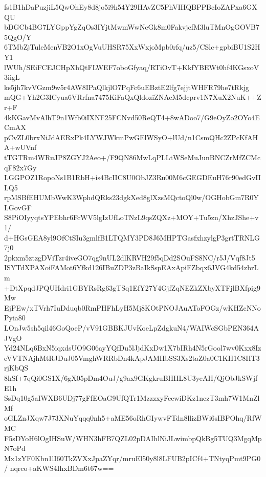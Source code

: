 fs1B1hDaPuzjiL5QwOhEy8d8jo5i9h54Y29HAvZC5PhVIHQBPPBcIoZAPxa6GXQU
bDGCb4BG7LYGppYgZqOs3IYjtMwmWwNcGk8m0FakvjcfM3luTMnOgGOVB75QgO/Y
6TMbZjTuleMenVB2O1xOgVuUHSR75XxWxjoMpb0rfq/uz5/CSlc+gpbiBU1S2HY1
lWUh/SEiFCEJCHpXhQtFLWEF7oboGfyaq/RTiOvT+KkfYBEWt0hf4KGsxoV3iigL
ks5jh7kvVGzm9w5r4AW8IPaQlkjlO7PqFc6uEBztE2lfg7ejjtWHFR79he7tRkjg
mQG+Yh2G3ICyua6VRrfna7475KiFaQxQldoziZNAcM5dcprv1N7XuX2NuK++Zr+F
4kKGavMvAlhT9n1Wfb0iIXNF25FCNvd50ReQT4+8wADoo7/G9eOyZo2OYo4ECmAX
pCvZL0brxNiJdAERxPk4LYWJWkmPwGElWSyO+lUd/n1CsmQHc2ZPcKfAHA+wUVnf
tTGTRm4WRuJP8ZGYJ2Aeo+/F9QN86MwLqPLLtWSeMuJunBNCZrMfZCMcqF82x7Gy
LGGPOZ1RopoNs1B1RbH+is4BcIIC8U0ObJZ3Ru00M6cGEGDEuH76r90edGvIILQ5
rpMSBfEHUMbWwK3WphdQRks23dgkXed8glXzsMQctoQl0w/OGHobGm7R0YLGovGF
S8PiOIyyqtsYPEbhr6FcWV5lgIzUfLoTNzL9qsZQXz+MOY+Tu5zn/XhzJShe+v1/
d+HGsGEA8yl9OfCtSIu3gmlfB1LTQMY3PD8J6MHPTGasfxhzylgP3grtTRNLG7j0
2pkxm5ztzgDViTzr4iveGO7qg9nUL2dlKRVH29f5qDd2SOuFS8NC/r5J/Vqf8Jt5
ISYTdXPAXoiFAMot6Yfkd126IBuZDP3zBaIkSspEAxApiFZbqx6JVG4kd54zbrLm
+DtXpqdJPQUHdri1GBYRsRg63gTSq1EfY27Y4GjfZqNEZkZXbyXTFjlBXfpig9Mw
EjPEw/xTVrh7IuDduqb0RmPHFhLyH5Mj8KOtPNOJAuAToFOGz/wKHZcNNoPyia80
LOnJw5sh5qil46GoQoeP/vV91GBBKJUvKoeLpZdgkuN4/WAIWcSGbPEN364AJVgO
Yd24NLq6BxN5iqxdsUO9G06ayYQfDu5lJjdKxDw1X7bIRh4N5rGool7wv0Kxx8Iz
eVVTNAjhMtRJDuJ05VmghWRRbDn4kApJAMHbSS3Xs2taZ0a0C1KH1C8HT3rjKbQS
8hSf+7qQi0GS1X/6gX05pDm4OuJ/g9ax9GKgkruBHHL8U3yeAH/QjObJkSWjfE1h
SsDq10g5aIWXB6UDj77gFfEOaG9UfQTr1MzzzxyFcewiDKz1nczT3mh7W1MnZlMf
oGLZnJXqw7J73XNuYqqq0nh5+aME56oRhGIywvFTdn8llizBWi6sIBPOhq/RfWMC
F5sDYoH6lOgIHSuW/WHN3hFB7QZL02pDAIhlNiJLwimbpQkBg5TUQ3MgqMpN7oPd
Mx1zYF0Kbn1lI60TkZVXxJpaZYqr/mruEl50y8l8LFUB2pICf4+TNtyqPmt9PG0/
nqrco+aKWS4IhxBDm6t67w==

